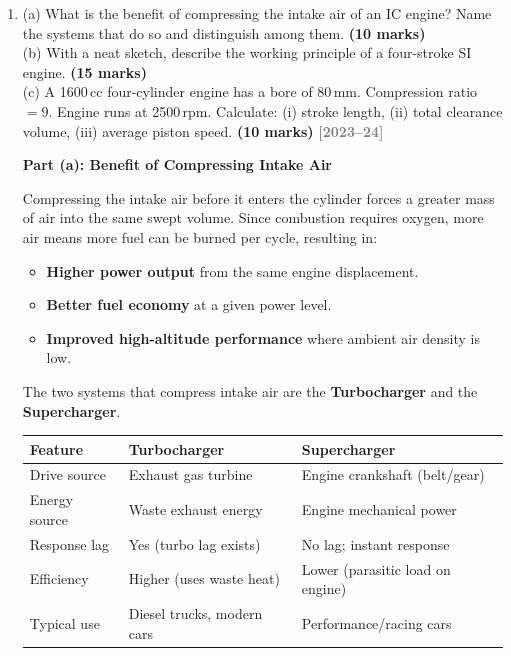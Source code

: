 \documentclass[12pt,a3paper]{article}
\newcommand{\yr}[1]{\hfill\textcolor{gray}{\small\textbf{[#1]}}}
\newcommand{\mk}[1]{\textcolor{orange!70!black}{\small\textbf{(#1 marks)}}}
\begin{document}
\begin{enumerate}
\item \label{qlabel:A2-Q1}
(a) What is the benefit of compressing the intake air of an IC engine? Name the systems that do so and distinguish among them. \mk{10}\\
(b) With a neat sketch, describe the working principle of a four-stroke SI engine. \mk{15}\\
(c) A 1600\,cc four-cylinder engine has a bore of 80\,mm. Compression ratio $= 9$. Engine runs at 2500\,rpm. Calculate: (i) stroke length, (ii) total clearance volume, (iii) average piston speed. \mk{10}
\yr{2023--24}

\begin{tcolorbox}[enhanced,breakable,ansbox,colback=cB!4,colframe=cB,
  boxrule=0.8pt,arc=5pt,
  title={\textbf{Answer}},fonttitle=\bfseries\color{white},colbacktitle=cB]

\textbf{Part (a): Benefit of Compressing Intake Air}

Compressing the intake air before it enters the cylinder forces a greater mass of
air into the same swept volume. Since combustion requires oxygen, more air means
more fuel can be burned per cycle, resulting in:
\begin{itemize}[leftmargin=1.5em,itemsep=2pt]
  \item \textbf{Higher power output} from the same engine displacement.
  \item \textbf{Better fuel economy} at a given power level.
  \item \textbf{Improved high-altitude performance} where ambient air density is low.
\end{itemize}

The two systems that compress intake air are the \textbf{Turbocharger} and the
\textbf{Supercharger}.

\begin{center}
\small
\begin{tabular}{@{}lll@{}}
\toprule
\textbf{Feature} & \textbf{Turbocharger} & \textbf{Supercharger} \\
\midrule
Drive source      & Exhaust gas turbine         & Engine crankshaft (belt/gear) \\
Energy source     & Waste exhaust energy        & Engine mechanical power \\
Response lag      & Yes (turbo lag exists)      & No lag; instant response \\
Efficiency        & Higher (uses waste heat)    & Lower (parasitic load on engine) \\
Typical use       & Diesel trucks, modern cars  & Performance/racing cars \\
\bottomrule
\end{tabular}
\end{center}


\end{tcolorbox}
\end{enumerate}
\end{document}
